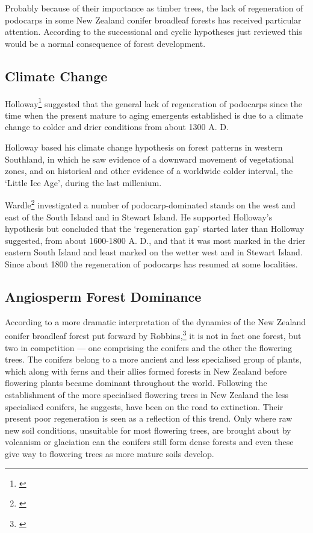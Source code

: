 Probably because of their importance as timber trees, the lack of regeneration of podocarps in some New Zealand conifer broadleaf forests has received particular attention.
According to the successional and cyclic hypotheses just reviewed this would be a normal consequence of forest development.

\subsection{Climate Change}

Holloway\footnote{\cite{holloway1954forests}} suggested that the general lack of regeneration of podocarps since the time when the present mature to aging emergents established is due to a climate change to colder and drier conditions from about 1300 A.
D.

Holloway based his climate change hypothesis on forest patterns in western Southland, in which he saw evidence of a downward movement of vegetational zones, and on historical and other evidence of a worldwide colder interval, the `Little Ice Age', during the last millenium.

Wardle\footnote{\cite{wardle1963regeneration}} investigated a number of podocarp-dominated stands on the west and east of the South Island and in Stewart Island.
He supported Holloway's hypothesis but concluded that the `regeneration gap' started later than Holloway suggested, from about 1600-1800 A.
D., and that it was most marked in the drier eastern South Island and least marked on the wetter west and in Stewart Island.
Since about 1800 the regeneration of podocarps has resumed at some localities.

\subsection{Angiosperm Forest Dominance}

According to a more dramatic interpretation of the dynamics of the New Zealand conifer broadleaf forest put forward by Robbins,\footnote{\cite{robbins1962podocarp}} it is not in fact one forest, but two in competition — one comprising the conifers and the other the flowering trees.
The conifers belong to a more ancient and less specialised group of plants, which along with ferns and their allies formed forests in New Zealand before flowering plants became dominant throughout the world.
Following the establishment of the more specialised flowering trees in New Zealand the less specialised conifers, he suggests, have been on the road to extinction.
Their present poor regeneration is seen as a reflection of this trend.
Only where raw new soil conditions, unsuitable for most flowering trees, are brought about by volcanism or glaciation can the conifers still form dense forests and even these give way to flowering trees as more mature soils develop.

